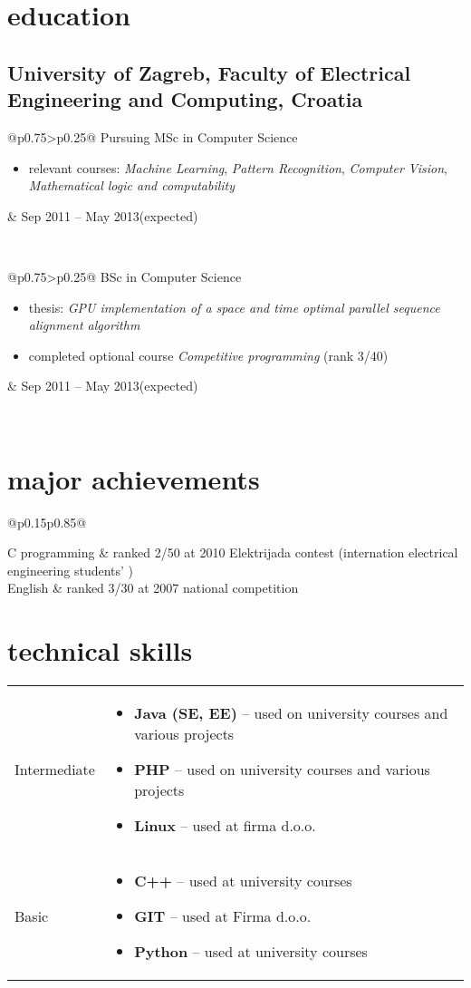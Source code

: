 \documentclass[a4paper]{article}
\makeatletter
\newlength{\tablewidth}
\newenvironment{period}[2]{%
\newcommand{\sarma}{#2}%
\setlength{\tablewidth}{\linewidth}
\addtolength{\tablewidth}{-2\tabcolsep}
\begin{tabular}{@{}p{0.75\tablewidth}>{\raggedleft\arraybackslash}p{0.25\tablewidth}@{}}%
#1 \newline
\begin{itemize}
}{%
\end{itemize} & \sarma \\%
\end{tabular}\\
}
\newenvironment{skills}{%
\setlength{\tablewidth}{\linewidth}
\addtolength{\tablewidth}{-2\tabcolsep}
\begin{tabular}{@{}p{0.15\tablewidth}p{0.85\tablewidth}@{}}
}{%
\end{tabular}
}
\makeatother
\begin{document}
\section{education}
\subsection{University of Zagreb, Faculty of Electrical Engineering and Computing, Croatia}
\begin{period}{Pursuing MSc in Computer Science}{Sep 2011 -- May 2013\linebreak(expected)}
    \item relevant courses:
        \textit{Machine Learning},
        \textit{Pattern Recognition},
        \textit{Computer Vision},
        \textit{Mathematical logic and computability}
\end{period}
\begin{period}{BSc in Computer Science}{Sep 2008 -- Jul 2011}
    \item thesis:
        \textit{GPU implementation of a space and time optimal parallel sequence alignment algorithm}
    \item completed optional course \textit{Competitive programming} (rank 3/40)
\end{period}

\section{major achievements}
\begin{skills}
    C programming   &   ranked 2/50 at 2010 Elektrijada contest (internation electrical engineering students' 
                        ) \\
    English         &   ranked 3/30 at 2007 national competition
\end{skills}

\section{technical skills}
\begin{skills}
    Intermediate &
    \begin{itemize}
        \item \textbf{Java (SE, EE)} -- used on university courses and various projects
        \item \textbf{PHP} -- used on university courses and various projects
        \item \textbf{Linux} -- used at firma d.o.o.
    \end{itemize} \\
    Basic &
    \begin{itemize}
        \item \textbf{C++} -- used at university courses
        \item \textbf{GIT} -- used at Firma d.o.o.
        \item \textbf{Python} -- used at university courses
    \end{itemize} \\
\end{skills}
\end{document}
